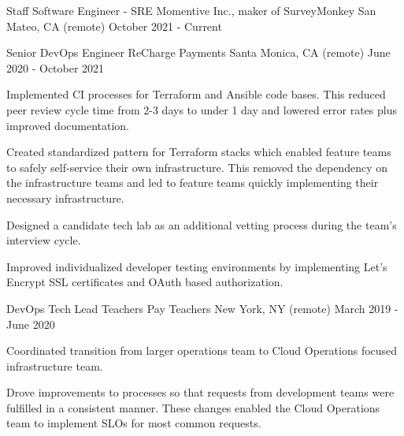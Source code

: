 

\begin{cventries}

  \cventry
  {Staff Software Engineer - SRE} %
  {Momentive Inc., maker of SurveyMonkey} %
  {San Mateo, CA  (remote)} %
  {October 2021 - Current} %
  {}

  \cventry
  {Senior DevOps Engineer} %
  {ReCharge Payments} %
  {Santa Monica, CA (remote)} %
  {June 2020 - October 2021} %
  { 
    \begin{cvitems} %
      \item {Implemented CI processes for Terraform and Ansible code bases. This reduced peer review cycle time from 2-3 days to under 1 day and lowered error rates plus improved documentation.}
      \item {Created standardized pattern for Terraform stacks which enabled feature teams to safely self-service their own infrastructure. This removed the dependency on the infrastructure teams and led to feature teams quickly implementing their necessary infrastructure.}
      \item {Designed a candidate tech lab as an additional vetting process during the team's interview cycle.}
      \item {Improved individualized developer testing environments by implementing Let's Encrypt SSL certificates and OAuth based authorization.}
    \end{cvitems}
  }

  \cventry
    {DevOps Tech Lead} %
    {Teachers Pay Teachers} %
    {New York, NY (remote)} %
    {March 2019 - June 2020} %
    {
      \begin{cvitems} %
        \item {Coordinated transition from larger operations team to Cloud Operations focused infrastructure team.}
        \item {Drove improvements to processes so that requests from development teams were fulfilled in a consistent manner. These changes enabled the Cloud Operations team to implement SLOs for most common requests.}
      \end{cvitems}
    }


\end{cventries}
